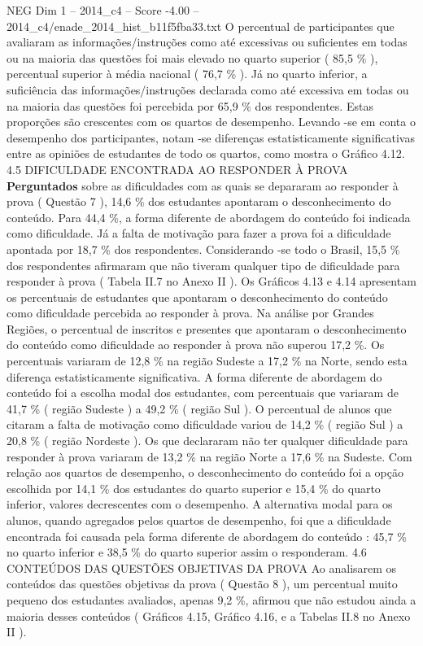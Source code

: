 \begin{textsample}{NEG Dim 1 – 2014\_c4 – Score -4.00 – 2014\_c4/enade\_2014\_hist\_b11f5fba33.txt}
O percentual de participantes que avaliaram as informações/instruções como até excessivas ou suficientes em todas ou na maioria das questões foi mais elevado no quarto superior ( 85,5 \% ), percentual superior à média nacional ( 76,7 \% ).
Já no quarto inferior, a suficiência das informações/instruções declarada como até excessiva em todas ou na maioria das questões foi percebida por 65,9 \% dos respondentes.
Estas proporções são crescentes com os quartos de desempenho.
Levando -se em conta o desempenho dos participantes, notam -se diferenças estatisticamente significativas entre as opiniões de estudantes de todo os quartos, como mostra o Gráfico 4.12. 4.5 DIFICULDADE ENCONTRADA AO RESPONDER À PROVA \textbf{Perguntados} sobre as dificuldades com as quais se depararam ao responder à prova ( Questão 7 ), 14,6 \% dos estudantes apontaram o desconhecimento do conteúdo.
Para 44,4 \%, a forma diferente de abordagem do conteúdo foi indicada como dificuldade.
Já a falta de motivação para fazer a prova foi a dificuldade apontada por 18,7 \% dos respondentes.
Considerando -se todo o Brasil, 15,5 \% dos respondentes afirmaram que não tiveram qualquer tipo de dificuldade para responder à prova ( Tabela II.7 no Anexo II ).
Os Gráficos 4.13 e 4.14 apresentam os percentuais de estudantes que apontaram o desconhecimento do conteúdo como dificuldade percebida ao responder à prova.
Na análise por Grandes Regiões, o percentual de inscritos e presentes que apontaram o desconhecimento do conteúdo como dificuldade ao responder à prova não superou 17,2 \%.
Os percentuais variaram de 12,8 \% na região Sudeste a 17,2 \% na Norte, sendo esta diferença estatisticamente significativa.
A forma diferente de abordagem do conteúdo foi a escolha modal dos estudantes, com percentuais que variaram de 41,7 \% ( região Sudeste ) a 49,2 \% ( região Sul ).
O percentual de alunos que citaram a falta de motivação como dificuldade variou de 14,2 \% ( região Sul ) a 20,8 \% ( região Nordeste ).
Os que declararam não ter qualquer dificuldade para responder à prova variaram de 13,2 \% na região Norte a 17,6 \% na Sudeste.
Com relação aos quartos de desempenho, o desconhecimento do conteúdo foi a opção escolhida por 14,1 \% dos estudantes do quarto superior e 15,4 \% do quarto inferior, valores decrescentes com o desempenho.
A alternativa modal para os alunos, quando agregados pelos quartos de desempenho, foi que a dificuldade encontrada foi causada pela forma diferente de abordagem do conteúdo : 45,7 \% no quarto inferior e 38,5 \% do quarto superior assim o responderam. 4.6 CONTEÚDOS DAS QUESTÕES OBJETIVAS DA PROVA Ao analisarem os conteúdos das questões objetivas da prova ( Questão 8 ), um percentual muito pequeno dos estudantes avaliados, apenas 9,2 \%, afirmou que não estudou ainda a maioria desses conteúdos ( Gráficos 4.15, Gráfico 4.16, e a Tabelas II.8 no Anexo II ).

\end{textsample}
